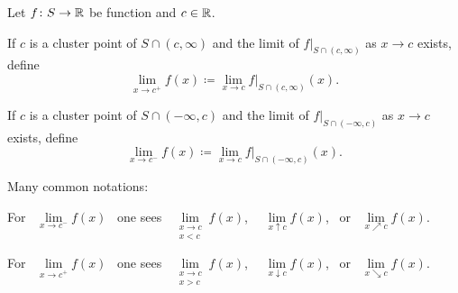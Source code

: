 \documentclass[10pt,aspectratio=169]{beamer}
\begin{document}
\begin{frame}

\begin{definition}
Let $f \colon S \to {\mathbb{R}}$ be function and $c \in {\mathbb{R}}$.

\pause
\medskip

If $c$ is a cluster point of $S \cap (c,\infty)$ and the limit
of $f|_{S \cap (c,\infty)}$ 
as $x \to c$ exists, define
\begin{equation*}
\lim_{x \to c^+} f(x) \coloneqq \lim_{x\to c} f|_{S \cap (c,\infty)}(x) .
\end{equation*}

\pause
If $c$ is a cluster point of 
$S \cap (-\infty,c)$ and the limit
of $f|_{S \cap (-\infty,c)}$ 
as $x \to c$ exists, define
\begin{equation*}
\lim_{x \to c^-} f(x) \coloneqq \lim_{x\to c} f|_{S \cap (-\infty,c)}(x) .
\end{equation*}
\end{definition}

\pause
Many common notations: 

\medskip

For
~$\lim\limits_{x \to c^-} f(x)$~ one sees
~$\lim\limits_{\substack{x \to c\\x < c}} f(x)$,~
~$\lim\limits_{x \uparrow c} f(x)$,~ or
~$\lim\limits_{x \nearrow c} f(x)$.

\medskip

For
~$\lim\limits_{x \to c^+} f(x)$~ one sees
~$\lim\limits_{\substack{x \to c\\x > c}} f(x)$,~
~$\lim\limits_{x \downarrow c} f(x)$,~ or
~$\lim\limits_{x \searrow c} f(x)$.


\end{frame}
\end{document}
